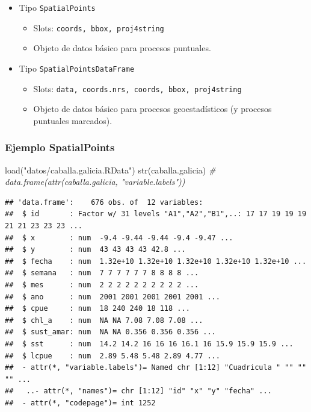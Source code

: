 \documentclass[
  spanish,
]{book}
\newenvironment{Shaded}{\begin{snugshade}}{\end{snugshade}}
\newcommand{\CommentTok}[1]{\textcolor[rgb]{0.56,0.35,0.01}{\textit{#1}}}
\newcommand{\FunctionTok}[1]{\textcolor[rgb]{0.00,0.00,0.00}{#1}}
\newcommand{\NormalTok}[1]{#1}
\newcommand{\StringTok}[1]{\textcolor[rgb]{0.31,0.60,0.02}{#1}}
\theoremstyle{break}
\theoremstyle{definition}
\theoremstyle{definition}
\theoremstyle{definition}
\theoremstyle{definition}
\theoremstyle{remark}
\begin{document}
\begin{itemize}
\item
  Tipo \texttt{SpatialPoints}

  \begin{itemize}
  \item
    Slots: \texttt{coords,\ bbox,\ proj4string}
  \item
    Objeto de datos básico para procesos puntuales.
  \end{itemize}
\item
  Tipo \texttt{SpatialPointsDataFrame}

  \begin{itemize}
  \item
    Slots: \texttt{data,\ coords.nrs,\ coords,\ bbox,\ proj4string}
  \item
    Objeto de datos básico para procesos geoestadísticos (y procesos
    puntuales marcados).
  \end{itemize}
\end{itemize}

\hypertarget{ejemplo-spatialpoints}{%
\subsubsection{Ejemplo SpatialPoints}\label{ejemplo-spatialpoints}}

\begin{Shaded}
\begin{Highlighting}[]
\FunctionTok{load}\NormalTok{(}\StringTok{"datos/caballa.galicia.RData"}\NormalTok{)}
\FunctionTok{str}\NormalTok{(caballa.galicia)  }\CommentTok{\# data.frame(attr(caballa.galicia, "variable.labels"))}
\end{Highlighting}
\end{Shaded}

\begin{verbatim}
## 'data.frame':    676 obs. of  12 variables:
##  $ id       : Factor w/ 31 levels "A1","A2","B1",..: 17 17 19 19 19 21 21 23 23 23 ...
##  $ x        : num  -9.4 -9.44 -9.44 -9.4 -9.47 ...
##  $ y        : num  43 43 43 43 42.8 ...
##  $ fecha    : num  1.32e+10 1.32e+10 1.32e+10 1.32e+10 1.32e+10 ...
##  $ semana   : num  7 7 7 7 7 7 8 8 8 8 ...
##  $ mes      : num  2 2 2 2 2 2 2 2 2 2 ...
##  $ ano      : num  2001 2001 2001 2001 2001 ...
##  $ cpue     : num  18 240 240 18 118 ...
##  $ chl_a    : num  NA NA 7.08 7.08 7.08 ...
##  $ sust_amar: num  NA NA 0.356 0.356 0.356 ...
##  $ sst      : num  14.2 14.2 16 16 16 16.1 16 15.9 15.9 15.9 ...
##  $ lcpue    : num  2.89 5.48 5.48 2.89 4.77 ...
##  - attr(*, "variable.labels")= Named chr [1:12] "Cuadricula " "" "" "" ...
##   ..- attr(*, "names")= chr [1:12] "id" "x" "y" "fecha" ...
##  - attr(*, "codepage")= int 1252
\end{verbatim}
\end{document}

